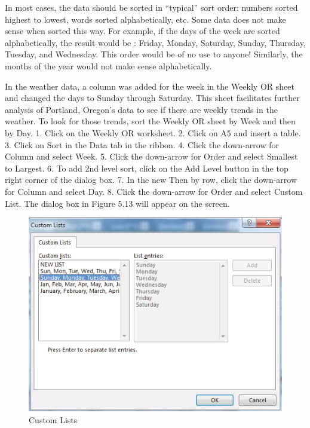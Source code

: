 In most cases, the data should be sorted in ``typical'' sort order: numbers sorted highest to lowest, words sorted alphabetically, etc. Some data does not make sense when sorted this way. For example, if the days of the week are sorted alphabetically, the result would be : Friday, Monday, Saturday, Sunday, Thursday, Tuesday, and Wednesday. This order would be of no use to anyone! Similarly, the months of the year would not make sense alphabetically.

In the weather data, a column was added for the week in the Weekly OR sheet and changed the days to Sunday through Saturday. This sheet facilitates further analysis of Portland, Oregon's data to see if there are weekly trends in the weather. To look for those trends, sort the Weekly OR sheet by Week and then by Day.
1.   Click on the Weekly OR worksheet.
2.   Click on A5 and insert a table.
3.   Click on Sort in the Data tab in the ribbon.
4.   Click the down-arrow for Column and select Week.
5.   Click the down-arrow for Order and select Smallest to Largest.
6.   To add 2nd level sort, click on the Add Level button in the top right corner of the dialog box.
7.   In the new Then by row, click the down-arrow for Column and select Day.
8.   Click the down-arrow for Order and select Custom List. The dialog box in Figure 5.13 will appear on the screen.

\begin{figure}[H]
	\centering
	\includegraphics[width=\maxwidth{.95\linewidth}]{gfx/ch05_fig13}
	\caption{Custom Lists}
	\label{05:fig13}
\end{figure}







